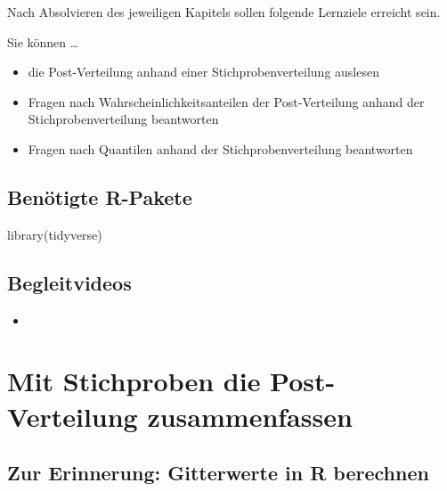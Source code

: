 \documentclass[
  a4paper,
  DIV=11]{scrreprt}
\newenvironment{Shaded}{\begin{snugshade}}{\end{snugshade}}
\newcommand{\FunctionTok}[1]{\textcolor[rgb]{0.28,0.35,0.67}{#1}}
\newcommand{\NormalTok}[1]{\textcolor[rgb]{0.00,0.23,0.31}{#1}}
\providecommand{\tightlist}{%
  \setlength{\itemsep}{0pt}\setlength{\parskip}{0pt}}\usepackage{longtable,booktabs,array}
\theoremstyle{definition}
\theoremstyle{remark}
\begin{document}
Nach Absolvieren des jeweiligen Kapitels sollen folgende Lernziele
erreicht sein.

Sie können \ldots{}

\begin{itemize}
\tightlist
\item
  die Post-Verteilung anhand einer Stichprobenverteilung auslesen
\item
  Fragen nach Wahrscheinlichkeitsanteilen der Post-Verteilung anhand der
  Stichprobenverteilung beantworten
\item
  Fragen nach Quantilen anhand der Stichprobenverteilung beantworten
\end{itemize}

\hypertarget{benuxf6tigte-r-pakete-2}{%
\subsection{Benötigte R-Pakete}\label{benuxf6tigte-r-pakete-2}}

\begin{Shaded}
\begin{Highlighting}[]
\FunctionTok{library}\NormalTok{(tidyverse)}
\end{Highlighting}
\end{Shaded}

\hypertarget{begleitvideos-4}{%
\subsection{Begleitvideos}\label{begleitvideos-4}}

\begin{itemize}
\tightlist
\item
  \href{}{}
\end{itemize}

\hypertarget{mit-stichproben-die-post-verteilung-zusammenfassen}{%
\section{Mit Stichproben die Post-Verteilung
zusammenfassen}\label{mit-stichproben-die-post-verteilung-zusammenfassen}}

\hypertarget{zur-erinnerung-gitterwerte-in-r-berechnen}{%
\subsection{Zur Erinnerung: Gitterwerte in R
berechnen}\label{zur-erinnerung-gitterwerte-in-r-berechnen}}
\end{document}
